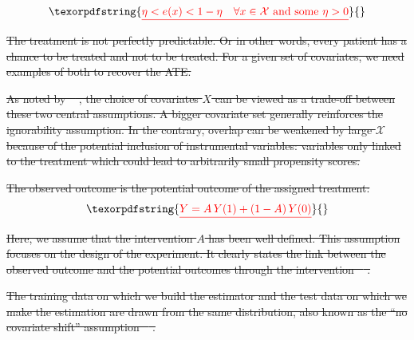 \documentclass[10pt,letterpaper]{article}
\newtheorem{assumption}{Assumption}
\providecommand{\DIFdeltex}[1]{{\protect\color{red}\sout{#1}}}                      %
\providecommand{\DIFdel}[1]{\texorpdfstring{\DIFdeltex{#1}}{}} %
\begin{document}
\begin{displaymath}\DIFdel{%
    \eta < e(x) < 1 - \eta \quad \forall x \in \mathcal{X} \text{ and some }   \eta > 0
  }\end{displaymath}%
\DIFdel{The treatment is not perfectly predictable. Or in other words, every
  patient has a chance to be treated and not to be treated. For a given set of
  covariates, we need examples of both to recover the ATE.
}%

\DIFdel{As noted by \mbox{%
    \cite{damour2020overlap}}\hskip0pt%
  , the choice of covariates $X$ can
  be viewed as a trade-off between these two central assumptions. A bigger
  covariate set generally reinforces the ignorability assumption. In the
  contrary, overlap can be weakened by large $\mathcal{X}$ because of the
  potential inclusion of instrumental variables: variables only linked to the treatment which
  could lead to arbitrarily small propensity scores.
}%


\DIFdel{The observed
  outcome is the potential outcome of the assigned treatment:
}\begin{displaymath}\DIFdel{%
    Y = A \, Y(1) + (1-A) \, Y(0)
  }\end{displaymath}%
\DIFdel{Here, we assume that the intervention $A$ has been well defined. This
  assumption focuses on the design of the experiment. It clearly states the link
  between the observed outcome and the potential outcomes through the
  intervention \mbox{%
    \cite{hernan2020causal}}\hskip0pt%
  .
}%

\DIFdel{The training
  data on which we build the estimator and the test data on which we make the
  estimation are drawn from the same distribution, also known as
  the ``no covariate shift'' assumption \mbox{%
    \cite{jesson2020identifying}}\hskip0pt%
  .
}%
\end{document}

